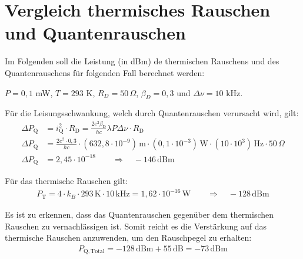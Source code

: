 
\section{Vergleich thermisches Rauschen und Quantenrauschen}

Im Folgenden soll die Leistung (in dBm) de thermischen Rauschens und des Quantenrauschens für folgenden Fall berechnet werden:

$P = 0,1$ mW, $T = 293$ K, $R_D = 50\, \Omega$, $\beta_D = 0,3$ und $\Delta \nu = 10$ kHz.

Für die Leisungsschwankung, welch durch Quantenrauschen verursacht wird, gilt:
\begin{align}
    \Delta P_\mathrm{Q} &= i^2_\mathrm{Q} \cdot R_\mathrm{D} = \frac{2e^2\beta_\mathrm{D}}{hc}\lambda P \Delta \nu \cdot R_\mathrm{D}\\
    \Delta P_\mathrm{Q} &= \frac{2e^2 \cdot 0,3}{hc} \cdot (632,8 \cdot 10^{-9}) \, \mathrm{m} \cdot (0,1 \cdot 10^{-3})\, \mathrm{W} \cdot (10 \cdot 10^3) \, \mathrm{Hz} \cdot 50 \, \Omega \\
    \Delta P_\mathrm{Q} &= 2,45 \cdot 10^{-18} \qquad \Rightarrow \quad -146 \, \mathrm{dBm}
\end{align}

Für das thermische Rauschen gilt:
\begin{gather}
    P_\mathrm{T} = 4 \cdot k_B \cdot 293\,\text{K} \cdot 10\,\text{kHz} = 1,62 \cdot 10^{-16}\, \text{W} \qquad \Rightarrow \quad -128 \, \text{dBm}
\end{gather}

Es ist zu erkennen, dass das Quantenrauschen gegenüber dem thermischen Rauschen zu vernachlässigen ist.
Somit reicht es die Verstärkung auf das thermische Rauschen anzuwenden, um den Rauschpegel zu erhalten:
\begin{gather}
    P_\mathrm{Q,Total} = -128 \, \text{dBm} + 55\, \text{dB} = -73 \, \text{dBm}
\end{gather}